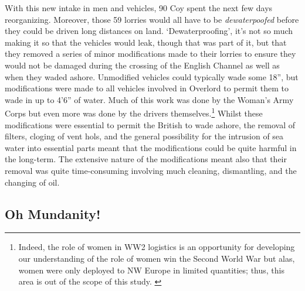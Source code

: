 \documentclass[noraggedright]{turabian-researchpaper}
\newcommand{\Waterproofing}{202 O.C.T.U., R.A.S.C. Training School. 
Waterproofing Vehicles}
\begin{document}
With this new intake in men and vehicles, 90 Coy spent the next few days 
reorganizing.  Moreover, those 59 lorries would all have to be 
\textit{dewaterpoofed} before they could be driven long distances on land.  
`Dewaterproofing', it's not so much making it so that the 
vehicles would leak, though that was part of it, but that they removed a series 
of minor modifications made to their lorries to ensure they would not be 
damaged during the crossing of the English Channel as well as when they waded 
ashore.  Unmodified vehicles
could typically wade some 18'', but modifications were made to all 
vehicles involved in Overlord to permit them to wade in up to 4'6'' of 
water.\autocite[165]{com-ops-org}
Much of this work
was done by the Woman's Army Corps but even more was done by the drivers 
themselves.\footnote{Indeed, the role of women in WW2 
logistics is an opportunity for developing our understanding of the role of
women win the Second World War but alas, women were only deployed to NW Europe
in limited quantities; thus, this area is out of the scope of this study.
\cite[122-6]{brit-oth-army} \cite[\Waterproofing][1]{pope-pp}
}  Whilst these modifications were essential to permit the British to wade 
ashore, the removal of filters, cloging of vent hols, and the general 
possibility for the intrusion of sea water into essential parts meant that
the modifications could be quite harmful in the long-term.  The extensive
nature of the modifications meant also that their removal was quite 
time-consuming involving much cleaning, dismantling, and the changing of 
oil.\autocites[Adm Instr No 2. 16 Jun 194]{6aqwd}[\Waterproofing][3, 10-1]
{pope-pp}





\subsection{Oh Mundanity!}
\end{document}
